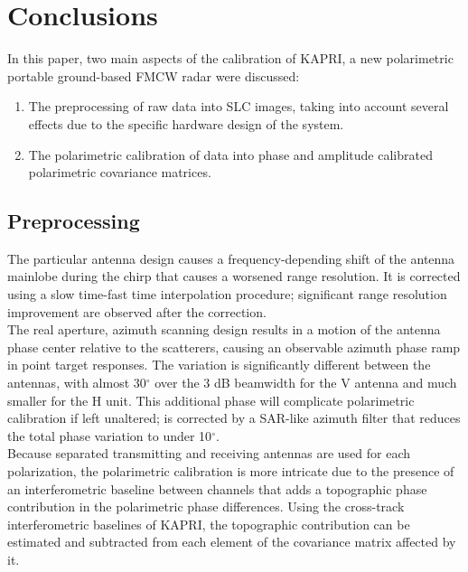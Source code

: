 \section{Conclusions}\label{sec:conclusions}
In this paper, two main aspects of the calibration of KAPRI, a new polarimetric portable ground-based FMCW radar were discussed:
\begin{enumerate}
	\item The preprocessing of raw data into SLC images, taking into account several effects due to the specific hardware design of the system.
	\item The polarimetric calibration of data into phase and amplitude calibrated polarimetric covariance matrices.
\end{enumerate}
\subsection{Preprocessing}
 The particular antenna design causes a frequency-depending shift of the antenna mainlobe during the chirp that causes a worsened range resolution. It is corrected using a slow time-fast time interpolation procedure; significant range resolution improvement are observed after the correction.\\ The real aperture, azimuth scanning design results in a motion of the antenna phase center relative to the scatterers, causing an observable azimuth phase ramp in point target responses. The variation is significantly different between the antennas, with almost 30$^\circ$ over the 3 dB beamwidth for the V antenna and much smaller for the H unit. This additional phase will complicate polarimetric calibration if left unaltered; is corrected by a SAR-like azimuth filter that reduces the total phase variation to under 10$^\circ$.\\
Because separated transmitting and receiving antennas are used for each polarization, the polarimetric calibration is more intricate due to the presence of an interferometric baseline between channels that adds a topographic phase contribution in the polarimetric phase differences. Using the cross-track interferometric baselines of KAPRI, the topographic contribution can be estimated and subtracted from each element of the covariance matrix affected by it.
